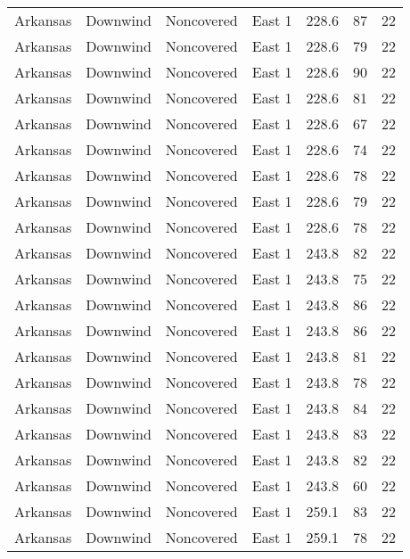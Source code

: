 \documentclass{article}
\begin{document}
\begin{longtable}[H]{ccccccc}
Arkansas & Downwind  & Noncovered & East 1        & 228.6        & 87          & 22  \\
Arkansas & Downwind  & Noncovered & East 1        & 228.6        & 79          & 22  \\
Arkansas & Downwind  & Noncovered & East 1        & 228.6        & 90          & 22  \\
Arkansas & Downwind  & Noncovered & East 1        & 228.6        & 81          & 22  \\
Arkansas & Downwind  & Noncovered & East 1        & 228.6        & 67          & 22  \\
Arkansas & Downwind  & Noncovered & East 1        & 228.6        & 74          & 22  \\
Arkansas & Downwind  & Noncovered & East 1        & 228.6        & 78          & 22  \\
Arkansas & Downwind  & Noncovered & East 1        & 228.6        & 79          & 22  \\
Arkansas & Downwind  & Noncovered & East 1        & 228.6        & 78          & 22  \\
Arkansas & Downwind  & Noncovered & East 1        & 243.8        & 82          & 22  \\
Arkansas & Downwind  & Noncovered & East 1        & 243.8        & 75          & 22  \\
Arkansas & Downwind  & Noncovered & East 1        & 243.8        & 86          & 22  \\
Arkansas & Downwind  & Noncovered & East 1        & 243.8        & 86          & 22  \\
Arkansas & Downwind  & Noncovered & East 1        & 243.8        & 81          & 22  \\
Arkansas & Downwind  & Noncovered & East 1        & 243.8        & 78          & 22  \\
Arkansas & Downwind  & Noncovered & East 1        & 243.8        & 84          & 22  \\
Arkansas & Downwind  & Noncovered & East 1        & 243.8        & 83          & 22  \\
Arkansas & Downwind  & Noncovered & East 1        & 243.8        & 82          & 22  \\
Arkansas & Downwind  & Noncovered & East 1        & 243.8        & 60          & 22  \\
Arkansas & Downwind  & Noncovered & East 1        & 259.1        & 83          & 22  \\
Arkansas & Downwind  & Noncovered & East 1        & 259.1        & 78          & 22  \\

\end{longtable}
\end{document}
